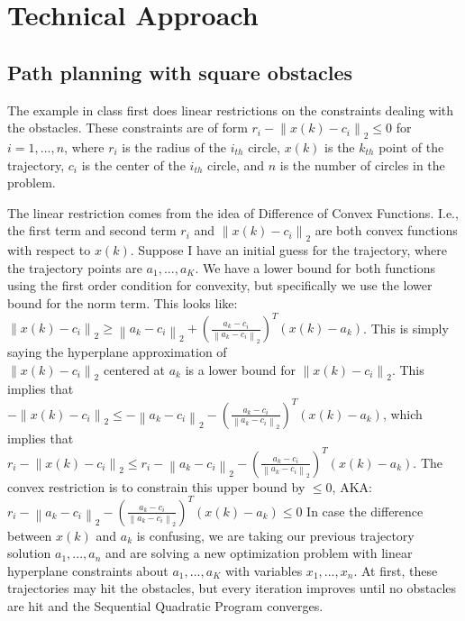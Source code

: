 \documentclass[conference]{IEEEtran}
\newcommand{\norm}[1]{\left\lVert #1 \right\rVert}
\begin{document}
\section{Technical Approach}

\subsection{Path planning with square obstacles}

The example in class \cite{b1} first does linear restrictions on the constraints dealing with the obstacles.
These constraints are of form $r_i - \norm{x(k)-c_i}_2 \le 0$ for $i = 1,...,n$, where $r_i$ is the
radius of the $i_{th}$ circle, $x(k)$ is the $k_{th}$ point of the trajectory, $c_i$ is the center 
of the $i_{th}$ circle, and $n$ is the number of circles in the problem.

The linear restriction comes from the idea of Difference of Convex Functions. I.e., the first term and
second term $r_i$ and $\norm{x(k)-c_i}_2$ are both convex functions with respect to $x(k)$. 
Suppose I have an initial guess for the trajectory, where the trajectory points are $a_1, ..., a_K$.
We have a lower
bound for both functions using the first order condition for convexity, but specifically we use the lower bound for the norm term.
This looks like: \\
$\norm{x(k)-c_i}_2 \ge \norm{a_k-c_i}_2 + (\frac{a_k - c_i}{\norm{a_k - c_i}_2})^T(x(k)-a_k)$. This is simply saying the hyperplane approximation of \\
$\norm{x(k)-c_i}_2$ 
centered at $a_k$ is a lower bound for $\norm{x(k)-c_i}_2$. This implies that\\ 
$-\norm{x(k)-c_i}_2 \le -\norm{a_k-c_i}_2 - (\frac{a_k - c_i}{\norm{a_k - c_i}_2})^T(x(k)-a_k)$, which implies that\\
$r_i - \norm{x(k)-c_i}_2 \le r_i - \norm{a_k-c_i}_2 - (\frac{a_k - c_i}{\norm{a_k - c_i}_2})^T(x(k)-a_k)$. The convex 
restriction is to constrain this upper bound by $\le0$, 
AKA: $r_i - \norm{a_k-c_i}_2 - (\frac{a_k - c_i}{\norm{a_k - c_i}_2})^T(x(k)-a_k) \le 0$
In case the difference between $x(k)$ and $a_k$ is confusing, we are taking our previous trajectory solution
$a_1,...,a_n$ and are solving a new optimization problem with linear hyperplane constraints about $a_1,...,a_K$ 
with variables $x_1,...,x_n$. At first, these trajectories may hit the obstacles, but every iteration improves 
until no obstacles are hit and the Sequential Quadratic Program converges. 
\end{document}
